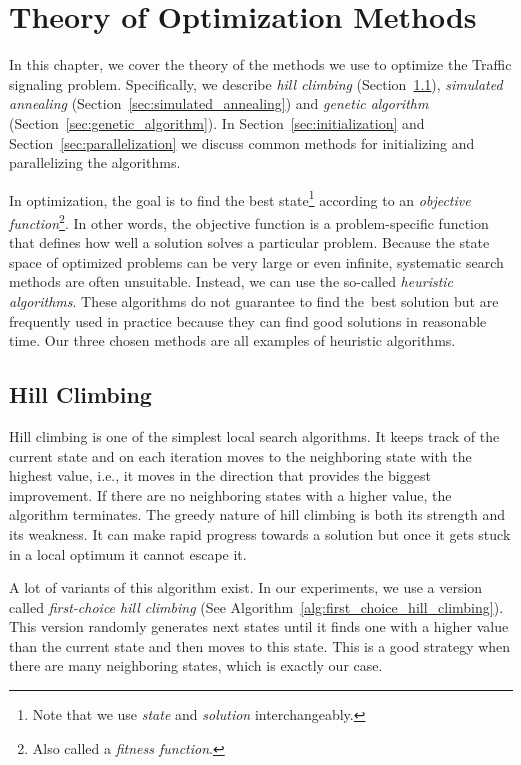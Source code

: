 \chapter{Theory of Optimization Methods} \label{chap:optimization_methods}

In this chapter, we cover the theory of the methods we use to optimize the Traffic signaling problem. Specifically, we describe \textit{hill climbing} (Section~\ref{sec:hill_climbing}), \textit{simulated annealing} (Section~\ref{sec:simulated_annealing}) and \textit{genetic algorithm} (Section~\ref{sec:genetic_algorithm}). In Section~\ref{sec:initialization} and Section~\ref{sec:parallelization} we discuss common methods for initializing and parallelizing the algorithms.

In optimization, the goal is to find the best state\footnote{Note that we use \textit{state} and \textit{solution} interchangeably.} according to an \textit{objective function}\footnote{Also called a \textit{fitness function}.}. In other words, the objective function is a problem-specific function that defines how well a solution solves a particular problem.
Because the state space of optimized problems can be very large or even infinite, systematic search methods are often unsuitable. Instead, we can use the so-called \textit{heuristic algorithms}. These algorithms do not guarantee to find
the~best
solution but are frequently used in practice because they can find good solutions in reasonable time. Our three chosen methods are all examples of heuristic algorithms.

\section{Hill Climbing} \label{sec:hill_climbing}

Hill climbing \cite{russell2020artificial, luke2013essentials} is one of the simplest local search algorithms. It keeps track of the current state and on each iteration moves to the neighboring state with the highest value, i.e., it moves in the direction that provides the biggest improvement. If there are no neighboring states with a higher value, the algorithm terminates. The greedy nature of hill climbing is both its strength and its weakness. It can make rapid progress towards a solution but once it gets stuck in a local optimum it cannot escape it.

A lot of variants of this algorithm exist. In our experiments, we use a version called \textit{first-choice hill climbing} (See Algorithm~\ref{alg:first_choice_hill_climbing}). This version randomly generates next states until it finds one with a higher value than the current state and then moves to this state. This is a good strategy when there are many neighboring states, which is exactly our case.


